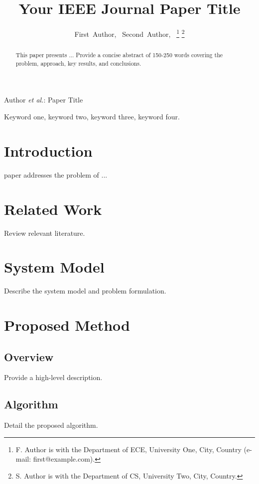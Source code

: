 \documentclass[journal]{IEEEtran}
\begin{document}
\title{Your IEEE Journal Paper Title}

\author{
  First~Author,~
  Second~Author,~
  \thanks{F. Author is with the Department of ECE, University One, City, Country (e-mail: first@example.com).}
  \thanks{S. Author is with the Department of CS, University Two, City, Country.}
}

{Author \MakeLowercase{\textit{et al.}}: Paper Title}

\maketitle

\begin{abstract}
This paper presents ... Provide a concise abstract of 150-250 words covering the problem, approach, key results, and conclusions.
\end{abstract}

\begin{IEEEkeywords}
Keyword one, keyword two, keyword three, keyword four.
\end{IEEEkeywords}

\section{Introduction}
 paper addresses the problem of ...

\section{Related Work}
Review relevant literature.

\section{System Model}
Describe the system model and problem formulation.

\section{Proposed Method}
\subsection{Overview}
Provide a high-level description.

\subsection{Algorithm}
Detail the proposed algorithm.
\end{document}
